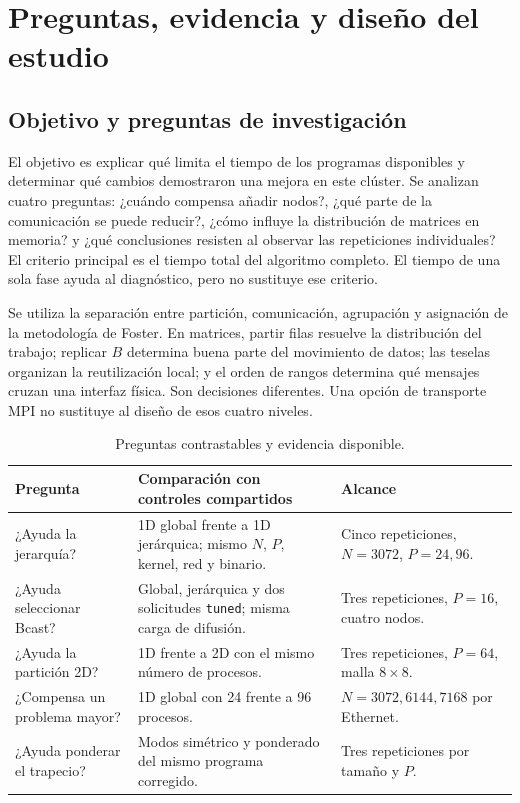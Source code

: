 \section{Preguntas, evidencia y diseño del estudio}

\subsection{Objetivo y preguntas de investigación}

El objetivo es explicar qué limita el tiempo de los programas disponibles y determinar qué cambios demostraron una mejora en este clúster. Se analizan cuatro preguntas: ¿cuándo compensa añadir nodos?, ¿qué parte de la comunicación se puede reducir?, ¿cómo influye la distribución de matrices en memoria? y ¿qué conclusiones resisten al observar las repeticiones individuales? El criterio principal es el tiempo total del algoritmo completo. El tiempo de una sola fase ayuda al diagnóstico, pero no sustituye ese criterio.

Se utiliza la separación entre partición, comunicación, agrupación y asignación de la metodología de Foster\cite{foster}. En matrices, partir filas resuelve la distribución del trabajo; replicar $B$ determina buena parte del movimiento de datos; las teselas organizan la reutilización local; y el orden de rangos determina qué mensajes cruzan una interfaz física. Son decisiones diferentes. Una opción de transporte MPI no sustituye al diseño de esos cuatro niveles.

\begin{table}[H]\centering\small
\caption{Preguntas contrastables y evidencia disponible.}
\begin{tabularx}{\linewidth}{p{3.3cm}X p{3.4cm}}
\toprule Pregunta & Comparación con controles compartidos & Alcance \\
\midrule
¿Ayuda la jerarquía? & 1D global frente a 1D jerárquica; mismo $N$, $P$, kernel, red y binario. & Cinco repeticiones, $N=3072$, $P=24,96$. \\
¿Ayuda seleccionar Bcast? & Global, jerárquica y dos solicitudes \texttt{tuned}; misma carga de difusión. & Tres repeticiones, $P=16$, cuatro nodos. \\
¿Ayuda la partición 2D? & 1D frente a 2D con el mismo número de procesos. & Tres repeticiones, $P=64$, malla $8\times8$. \\
¿Compensa un problema mayor? & 1D global con 24 frente a 96 procesos. & $N=3072,6144,7168$ por Ethernet. \\
¿Ayuda ponderar el trapecio? & Modos simétrico y ponderado del mismo programa corregido. & Tres repeticiones por tamaño y $P$. \\
\bottomrule
\end{tabularx}
\end{table}

